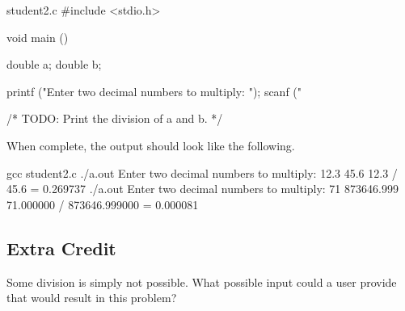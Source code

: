 \begin{code}{student2.c}
#include <stdio.h>

void main ()
{
    double a;
    double b;

    printf ("Enter two decimal numbers to multiply: ");
    scanf ("%

    /* TODO: Print the division of a and b. */
}
\end{code}

When complete, the output should look like the following.

\begin{Terminal}
gcc student2.c
./a.out
Enter two decimal numbers to multiply: 12.3 45.6
12.3 / 45.6 = 0.269737
./a.out
Enter two decimal numbers to multiply: 71 873646.999
71.000000 / 873646.999000 = 0.000081
\end{Terminal}

\subsection{Extra Credit}

Some division is simply not possible. What possible input could a user provide
that would result in this problem?
